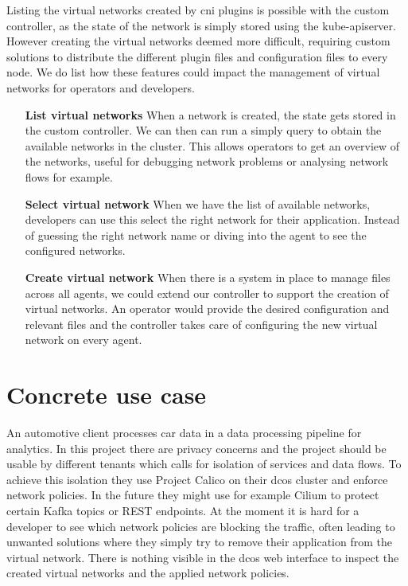 Listing the virtual networks created by \gls{cni} plugins is possible with the custom controller, as the state of the network is simply stored using the kube-apiserver. However creating the virtual networks deemed more difficult, requiring custom solutions to distribute the different plugin files and configuration files to every node. We do list how these features could impact the management of virtual networks for operators and developers.
\begin{itemize}
    \item[\textbf{List virtual networks}] When a network is created, the state gets stored in the custom controller. We can then can run a simply query to obtain the available networks in the cluster. This allows operators to get an overview of the networks, useful for debugging network problems or analysing network flows for example.
    \item[\textbf{Select virtual network}] When we have the list of available networks, developers can use this select the right network for their application. Instead of guessing the right network name or diving into the agent to see the configured networks.
    \item[\textbf{Create virtual network}] When there is a system in place to manage files across all agents, we could extend our controller to support the creation of virtual networks. An operator would provide the desired configuration and relevant files and the controller takes care of configuring the new virtual network on every agent.
\end{itemize}

\section{Concrete use case}
An automotive client processes car data in a data processing pipeline for analytics. In this project there are  privacy concerns and the project should be usable by different tenants which calls for isolation of services and data flows. To achieve this isolation they use Project Calico on their \gls{dcos} cluster and enforce network policies. In the future they might use for example Cilium to protect certain Kafka topics or REST endpoints. At the moment it is hard for a developer to see which network policies are blocking the traffic, often leading to unwanted solutions where they simply try to remove their application from the virtual network. There is nothing visible in the \gls{dcos} web interface to inspect the created virtual networks and the applied network policies.

